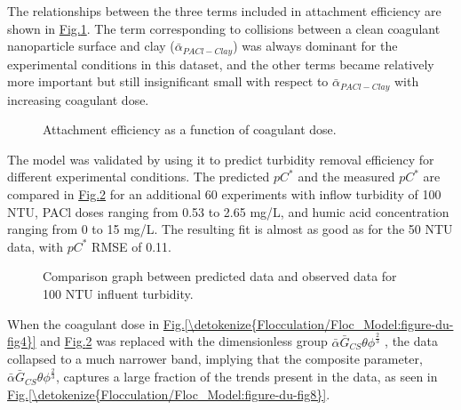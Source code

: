\documentclass[letterpaper,10pt,english]{sphinxmanual}
\let\sphinxpxdimen\pdfpxdimen\else\newdimen\sphinxpxdimen
\begin{document}
The relationships between the three terms included in attachment efficiency are shown in \hyperref[\detokenize{Flocculation/Floc_Model:figure-du-fig6}]{Fig.\@ \ref{\detokenize{Flocculation/Floc_Model:figure-du-fig6}}}.  The term corresponding to collisions between a clean coagulant nanoparticle surface and clay (\({\bar{\alpha }}_{PACl-Clay}\)) was always dominant for the experimental conditions in this dataset, and the other terms became relatively more important but still insignificant small with respect to \({\bar{\alpha }}_{PACl-Clay}\) with increasing coagulant dose.

\begin{figure}[htbp]
\centering
\capstart

\noindent\sphinxincludegraphics[width=400\sphinxpxdimen]{{Du_Fig6}.png}
\caption{Attachment efficiency as a function of coagulant dose.}\label{\detokenize{Flocculation/Floc_Model:id48}}\label{\detokenize{Flocculation/Floc_Model:figure-du-fig6}}\end{figure}

The model was validated by using it to predict turbidity removal efficiency for different experimental conditions. The predicted \(pC^*\) and the measured \(pC^*\) are compared in \hyperref[\detokenize{Flocculation/Floc_Model:figure-du-fig7}]{Fig.\@ \ref{\detokenize{Flocculation/Floc_Model:figure-du-fig7}}} for an additional 60 experiments with inflow turbidity of 100 NTU, PACl doses ranging from 0.53 to 2.65 mg/L, and humic acid concentration ranging from 0 to 15 mg/L. The resulting fit is almost as good as for the 50 NTU data, with \(pC^*\) RMSE of 0.11.

\begin{figure}[htbp]
\centering
\capstart

\noindent\sphinxincludegraphics[width=400\sphinxpxdimen]{{Du_Fig7}.png}
\caption{Comparison graph between predicted data and observed data for 100 NTU influent turbidity.}\label{\detokenize{Flocculation/Floc_Model:id49}}\label{\detokenize{Flocculation/Floc_Model:figure-du-fig7}}\end{figure}

When the coagulant dose in \hyperref[\detokenize{Flocculation/Floc_Model:figure-du-fig4}]{Fig.\@ \ref{\detokenize{Flocculation/Floc_Model:figure-du-fig4}}} and \hyperref[\detokenize{Flocculation/Floc_Model:figure-du-fig7}]{Fig.\@ \ref{\detokenize{Flocculation/Floc_Model:figure-du-fig7}}} was replaced with the dimensionless group \(\bar{\alpha }\bar G_{CS}\theta {\phi }^{\frac{2}{3}}\) , the data collapsed to a much narrower band, implying that the composite parameter, \(\bar{\alpha }\bar G_{CS}\theta {\phi }^{\frac{2}{3}}\), captures a large fraction of the trends present in the data, as seen in \hyperref[\detokenize{Flocculation/Floc_Model:figure-du-fig8}]{Fig.\@ \ref{\detokenize{Flocculation/Floc_Model:figure-du-fig8}}}.
\end{document}
